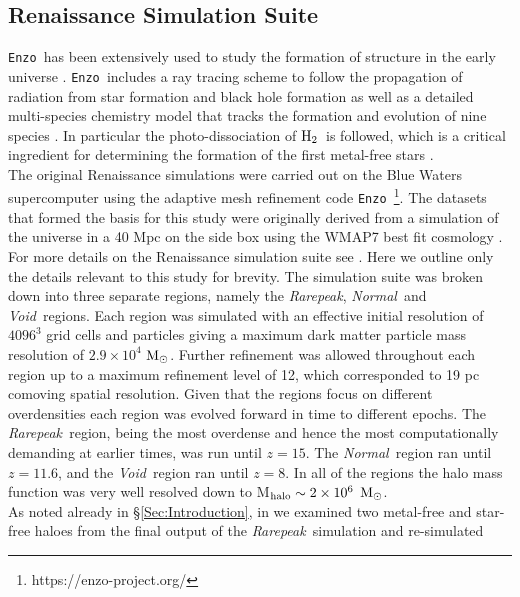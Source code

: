 \documentclass[graphics, twocolumn, usenatbib]{mn2e}
\newcommand{\enzo}{\texttt{Enzo~}}
\newcommand{\msolarc} {$\rm{M_{\odot}}$}
\newcommand{\molH} {$\rm{H_2}$~}
\newcommand{\rarepeak} {\textit{Rarepeak~}}
\newcommand{\rarepeakc} {\textit{Rarepeak}}
\newcommand{\normal} {\textit{Normal~}}
\newcommand{\void} {\textit{Void~}}
\begin{document}
\subsection{Renaissance Simulation Suite} \label{Sec:Renaissance}
\enzo has been extensively used to study the formation of structure in the early universe
\citep{Abel_2002, OShea_2005b, Turk_2012, Wise_2012b, Wise_2014, Regan_2015, Regan_2017}.
\enzo includes a ray tracing scheme to follow the propagation of radiation from
star formation and black hole formation \citep{WiseAbel_2011} as well as a detailed multi-species
chemistry model that tracks the formation and evolution of nine species \citep{Anninos_1997,
  Abel_1997}. In particular the photo-dissociation of \molH is followed, which is a critical
ingredient for determining the formation of the first metal-free stars \citep{Abel_2000}.\\
\indent The original Renaissance simulations \cite{Xu_2013, Xu_2014, OShea_2015} were carried out
on the Blue Waters supercomputer using the adaptive mesh refinement
code \enzo\citep{Enzo_2014, Enzo_2019}\footnote{https://enzo-project.org/}.
The datasets that formed the basis for this study were originally derived from a simulation of the
universe in a 40 Mpc on the side box using the WMAP7 best fit cosmology \citep{Komatsu_2011}.
For more details on the Renaissance simulation suite see \cite{Chen_2014}. Here we outline only
the details relevant to this study for brevity. The simulation suite was broken down into
three separate regions, namely the \rarepeakc, \normal and \void regions. Each region was simulated
with an effective initial resolution of $4096^3$ grid cells and particles giving a maximum dark matter
particle mass resolution of $2.9 \times 10^4$ \msolarc. Further refinement was allowed throughout
each region up to a maximum refinement level of 12, which corresponded to 19 pc comoving spatial
resolution. Given that the regions focus on different
 overdensities each region was evolved forward in time to different epochs. The \rarepeak region,
 being the most overdense and hence the most computationally demanding at earlier times, was run
 until $z = 15$. The \normal region ran until $z = 11.6$, and the \void region ran until $z = 8$.
 In all of the regions the halo mass function was very well resolved down to M$_{\rm halo} \sim 2
 \times 10^6$ \msolarc. \\
 \indent  As noted already in \S \ref{Sec:Introduction}, in \cite{Wise_2019} we examined two
 metal-free and star-free haloes from the final output of the \rarepeak simulation and re-simulated
\end{document}
